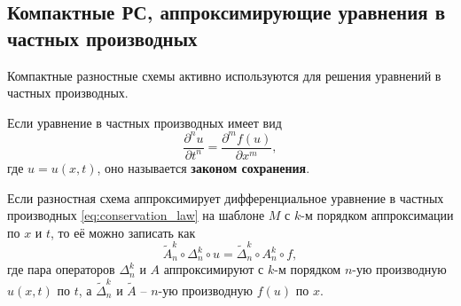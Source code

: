 \documentclass[../main.tex]{subfile}
\begin{document}
\subsection{Компактные РС, аппроксимирующие уравнения в частных производных}
Компактные разностные схемы активно используются для решения уравнений в
частных производных.

\begin{define}
\label{eq:conservation_law}
	Если уравнение в частных производных имеет вид
	\[\frac{\partial^nu}{\partial t^n}=\frac{\partial^mf(u)}{\partial x^m},\]
	где $u=u(x,t)$, оно называется \textbf{законом сохранения}.
\end{define}

\begin{theorem}
	Если разностная схема аппроксимирует дифференциальное уравнение в
	частных производных \eqref{eq:conservation_law} на шаблоне $M$ с $k$-м
	порядком аппроксимации по $x$ и $t$, то её можно записать как
	\[\boxed{\widetilde{A}_n^k\circ\Delta_n^k\circ u=\widetilde{\Delta}_n^k
	\circ A_n^k\circ f},\]
	где пара операторов $\Delta_n^k$ и $A$ аппроксимируют с $k$-м порядком
	$n$-ую производную $u(x,t)$ по $t$, а $\widetilde\Delta_n^k$ и
	$\widetilde{A}$ -- $n$-ую производную $f(u)$ по $x$.
\end{theorem}
\end{document}
